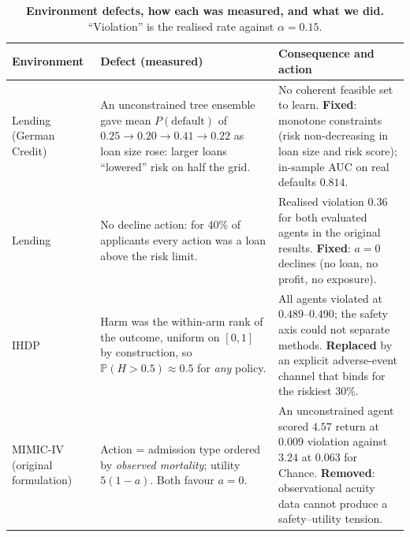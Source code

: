 \documentclass[10pt,a4paper]{article}
\begin{document}
\begin{table}[t]
\caption{\textbf{Environment defects, how each was measured, and what we did.} ``Violation'' is the
realised rate against $\alpha=0.15$.}
\label{tab:audit}
\centering\small
\begin{tabular}{p{2.3cm}p{6.0cm}p{6.4cm}}
\toprule
Environment & Defect (measured) & Consequence and action \\
\midrule
Lending (German Credit) & An unconstrained tree ensemble gave mean $P(\text{default})$ of
$0.25\to0.20\to0.41\to0.22$ as loan size rose: larger loans ``lowered'' risk on half the grid. &
No coherent feasible set to learn. \textbf{Fixed}: monotone constraints (risk non-decreasing in loan
size and risk score); in-sample AUC on real defaults $0.814$. \\
Lending & No decline action: for 40\% of applicants every action was a loan above the risk limit. &
Realised violation $0.36$ for both evaluated agents in the original results. \textbf{Fixed}: $a=0$
declines (no loan, no profit, no exposure). \\
IHDP & Harm was the within-arm rank of the outcome, uniform on $[0,1]$ by construction, so
$\mathbb P(H>0.5)\approx0.5$ for \emph{any} policy. & All agents violated at $0.489$--$0.490$; the
safety axis could not separate methods. \textbf{Replaced} by an explicit adverse-event channel that
binds for the riskiest 30\%. \\
MIMIC-IV (original formulation) & Action = admission type ordered by \emph{observed mortality};
utility $5(1-a)$. Both favour $a=0$. & An unconstrained agent scored $4.57$ return at $0.009$ violation
against $3.24$ at $0.063$ for Chance. \textbf{Removed}: observational acuity data cannot produce a
safety--utility tension. \\
\bottomrule
\end{tabular}
\end{table}
\end{document}
